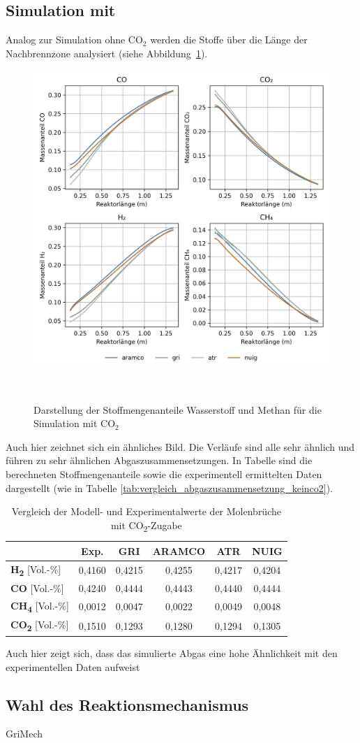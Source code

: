 \documentclass[footmark=none]{tubaf-thesis}
\begin{document}
        \subsection{Simulation mit }
        Analog zur Simulation ohne CO$_2$ werden die Stoffe über die Länge der Nachbrennzone analysiert (siehe Abbildung~\ref{fig:vergleich_h2_ch4_co2}).
        \begin{figure}[H]
            \centering
            \includegraphics[width=0.8\linewidth]{img_py/H2_CH4_CO_CO2.png}
            \caption{Darstellung der Stoffmengenanteile Wasserstoff und Methan für die Simulation mit CO$_2$}~\label{fig:vergleich_h2_ch4_co2}
        \end{figure}
        Auch hier zeichnet sich ein ähnliches Bild. Die Verläufe sind alle sehr ähnlich und führen zu sehr ähnlichen Abgaszusammensetzungen. In Tabelle sind die berechneten Stoffmengenanteile sowie die experimentell ermittelten Daten dargestellt (wie in Tabelle \ref{tab:vergleich_abgaszusammensetzung_keinco2}).
        \begin{table}[H]
            \centering\label{tab:vergleich_abgaszusammensetzung_co2}
            \caption{Vergleich der Modell- und Experimentalwerte der Molenbrüche mit CO\textsubscript{2}-Zugabe}
            \begin{tabular}{lccccc}
                \toprule
                & \textbf{Exp.} & \textbf{GRI} & \textbf{ARAMCO} & \textbf{ATR} & \textbf{NUIG} \\
                \midrule
                \textbf{H\textsubscript{2}} [Vol.-\%]   & 0,4160 & 0,4215 & 0,4255 & 0,4217 & 0,4204 \\
                \textbf{CO} [Vol.-\%]                  & 0,4240 & 0,4444 & 0,4443 & 0,4440 & 0,4444 \\
                \textbf{CH\textsubscript{4}} [Vol.-\%] & 0,0012 & 0,0047 & 0,0022 & 0,0049 & 0,0048 \\
                \textbf{CO\textsubscript{2}} [Vol.-\%] & 0,1510 & 0,1293 & 0,1280 & 0,1294 & 0,1305 \\
                \bottomrule
            \end{tabular}
        \end{table}
        Auch hier zeigt sich, dass das simulierte Abgas eine hohe Ähnlichkeit mit den experimentellen Daten aufweist
        \subsection{Wahl des Reaktionsmechanismus} 
            GriMech
    \pagebreak
    \printbibliography[heading=bibintoc,title=Quellenverzeichnis]
\end{document}
